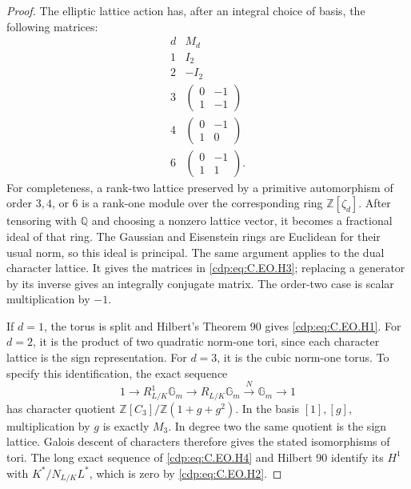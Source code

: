 \begin{proof}
The elliptic lattice action has, after an integral
choice of basis, the following matrices:
\[
\begin{array}{c|c}
d&M_d\\ \hline
1&I_2\\
2&-I_2\\
3&\begin{pmatrix}0&-1\\1&-1\end{pmatrix}\\
4&\begin{pmatrix}0&-1\\1&0\end{pmatrix}\\
6&\begin{pmatrix}0&-1\\1&1\end{pmatrix}.
\end{array}                                                   \tag{C.EO.H3}\label{cdp:eq:C.EO.H3}
\]
For completeness, a rank-two lattice preserved by a
primitive automorphism of order $3,4$, or $6$ is a
rank-one module over the corresponding ring
$\mathbb Z[\zeta_d]$. After tensoring with $\mathbb Q$
and choosing a nonzero lattice vector, it becomes
a fractional ideal of that ring. The Gaussian and
Eisenstein rings are Euclidean for their usual norm,
so this ideal is principal. The same argument applies
to the dual character lattice. It gives the matrices
in \eqref{cdp:eq:C.EO.H3}; replacing a generator by its inverse
gives an integrally conjugate matrix. The order-two
case is scalar multiplication by $-1$.

If $d=1$, the torus is split and Hilbert's Theorem 90
gives \eqref{cdp:eq:C.EO.H1}. For $d=2$, it is the product of two
quadratic norm-one tori, since each character lattice
is the sign representation. For $d=3$, it is the
cubic norm-one torus. To specify this identification,
the exact sequence
\[
 1\longrightarrow R^1_{L/K}\mathbb G_m
 \longrightarrow R_{L/K}\mathbb G_m
 \xrightarrow{\ N\ }\mathbb G_m\longrightarrow1
                                                               \tag{C.EO.H4}\label{cdp:eq:C.EO.H4}
\]
has character quotient
$\mathbb Z[C_3]/\mathbb Z(1+g+g^2)$.
In the basis $[1],[g]$, multiplication by $g$ is
exactly $M_3$. In degree two the same quotient is
the sign lattice. Galois descent of characters
therefore gives the stated isomorphisms of tori.
The long exact sequence of \eqref{cdp:eq:C.EO.H4} and Hilbert 90
identify its $H^1$ with $K^*/N_{L/K}L^*$, which is
zero by \eqref{cdp:eq:C.EO.H2}.


\end{proof}
